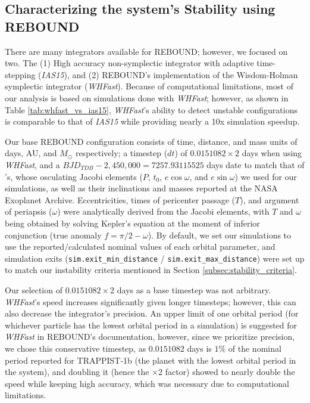 \documentclass{aa}
\begin{document}
\subsection{Characterizing the system's Stability using REBOUND}
\label{subsec:stability rebound}
There are many integrators available for REBOUND; however, we focused on two. The (1) High accuracy non-symplectic integrator with adaptive time-stepping (\textit{IAS15}), and (2) REBOUND's implementation of the Wisdom-Holman \citep{1991AJ....102.1528W} symplectic integrator (\textit{WHFast}). Because of computational limitations, most of our analysis is based on simulations done with \textit{WHFast}; however, as shown in Table \ref{tab:whfast_vs_ias15}, \textit{WHFast}'s ability to detect unstable configurations is comparable to that of \textit{IAS15} while providing nearly a 10x simulation speedup.

Our base REBOUND configuration consists of time, distance, and mass units of days, AU, and $M_\odot$ respectively; a timestep ($dt$) of $0.0151082\times2$ days when using \textit{WHFast}, and a $BJD_{TDB}-2,450,000=7257.93115525$ days date to match that of \cite{2021PSJ.....2....1A}'s, whose osculating Jacobi elements ($P$, $t_0$, $e\cos \omega$, and $e \sin \omega$) we used for our simulations, as well as their inclinations and masses reported at the NASA Exoplanet Archive. Eccentricities, times of pericenter passage ($T$), and argument of periapsis ($\omega$) were analytically derived from the Jacobi elements, with $T$ and $\omega$ being obtained by solving Kepler's equation at the moment of inferior conjunction (true anomaly $f=\pi/2-\omega$). By default, we set our simulations to use the reported/calculated nominal values of each orbital parameter, and simulation exits (\texttt{sim.exit\_min\_distance} / \texttt{sim.exit\_max\_distance}) were set up to match our instability criteria mentioned in Section \ref{subsec:stability_criteria}.


Our selection of $0.0151082\times2$ days as a base timestep was not arbitrary. \textit{WHFast}'s speed increases significantly given longer timesteps; however, this can also decrease the integrator's precision. An upper limit of one orbital period (for whichever particle has the lowest orbital period in a simulation) is suggested for \textit{WHFast} in REBOUND's documentation, however, since we prioritize precision, we chose this conservative timestep, as $0.0151082$ days is $1\%$ of the nominal period reported for TRAPPIST-1b (the planet with the lowest orbital period in the system), and doubling it (hence the $\times2$ factor) showed to nearly double the speed while keeping high accuracy, which was necessary due to computational limitations.
\end{document}
